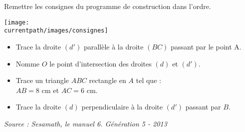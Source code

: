 \begin{exercice}
    Remettre les consignes du programme de construction dans l'ordre.
    \begin{center}
       \texttt{[image: \\currentpath/images/consignes]}
    \end{center}
    \vspace*{-5mm}
    \begin{itemize}
       \item Trace la droite $(d')$ parallèle à la droite $(BC)$ passant par le point A.
       \item Nomme $O$ le point d'intersection des droites $(d)$ et $(d')$.
       \item Trace un triangle $ABC$ rectangle en $A$ tel que : \\
        $AB = 8$ cm et $AC = 6$ cm.
       \item Trace la droite $(d)$ perpendiculaire à la droite $(d')$ passant par $B$.
    \end{itemize}
 \end{exercice}
 
 \hfill {\it\footnotesize Source : Sesamath, le manuel 6. Génération 5 - 2013}
 